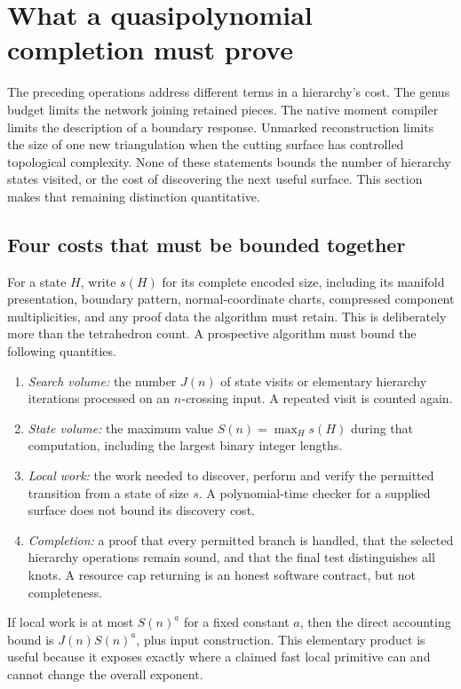\section{What a quasipolynomial completion must prove}
\label{sec:global-accounting}

The preceding operations address different terms in a hierarchy's cost.
The genus budget limits the network joining retained pieces.  The native
moment compiler limits the description of a boundary response.  Unmarked
reconstruction limits the size of one new triangulation when the cutting
surface has controlled topological complexity.  None of these statements
bounds the number of hierarchy states visited, or the cost of discovering
the next useful surface.  This section makes that remaining distinction
quantitative.

\subsection{Four costs that must be bounded together}

For a state $H$, write $s(H)$ for its complete encoded size, including its
manifold presentation, boundary pattern, normal-coordinate charts,
compressed component multiplicities, and any proof data the algorithm
must retain.  This is deliberately more than the tetrahedron count.  A
prospective algorithm must bound the following quantities.

\begin{enumerate}
\item \emph{Search volume:} the number $J(n)$ of state visits or elementary
hierarchy iterations processed on an $n$-crossing input.  A repeated visit
is counted again.
\item \emph{State volume:} the maximum value $S(n)=\max_H s(H)$ during
that computation, including the largest binary integer lengths.
\item \emph{Local work:} the work needed to discover, perform and verify
the permitted transition from a state of size $s$.  A polynomial-time
checker for a supplied surface does not bound its discovery cost.
\item \emph{Completion:} a proof that every permitted branch is handled,
that the selected hierarchy operations remain sound, and that the final
test distinguishes all knots.  A resource cap returning
 is an honest software contract, but not completeness.
\end{enumerate}

If local work is at most $S(n)^a$ for a fixed constant $a$, then the direct
accounting bound is $J(n)S(n)^a$, plus input construction.  This elementary
product is useful because it exposes exactly where a claimed fast local
primitive can and cannot change the overall exponent.

